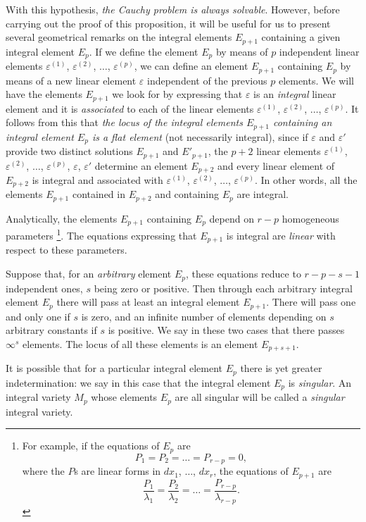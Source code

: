 \documentclass[leqno,11pt]{book}
\makeatletter
\theoremstyle{shape1}
\theoremstyle{shapesmall}
\let\old@epsilon\epsilon
\let\old@varepsilon\varepsilon
\let\epsilon\old@varepsilon
\let\varepsilon\old@epsilon
\makeatother
\begin{document}
With this hypothesis, \emph{the Cauchy problem is always solvable}. However, before carrying out the proof of this proposition, it will be useful for us to present several geometrical remarks on the integral elements $E_{p+1}$ containing a given integral element $E_{p}$. If we define the element $E_{p}$ by means of $p$ independent linear elements $\epsilon^{(1)}$, $\epsilon^{(2)}$, $\dots$, $\epsilon^{(p)}$, we can define an element $E_{p+1}$ containing $E_{p}$ by means of a new linear element $\epsilon$ independent of the previous $p$ elements. We will have the elements $E_{p+1}$ we look for by expressing that $\epsilon$ is an \emph{integral} linear element and it is \emph{associated} to each of the linear elements $\epsilon^{(1)}$, $\epsilon^{(2)}$, $\dots$, $\epsilon^{(p)}$. It follows from this that \emph{the locus of the integral elements $E_{p+1}$ containing an integral element $E_{p}$ is a flat element} (not necessarily integral), since if $\epsilon$ and $\epsilon'$ provide two distinct solutions $E_{p+1}$ and $E'_{p+1}$, the $p+2$ linear elements $\epsilon^{(1)}$, $\epsilon^{(2)}$, $\dots$, $\epsilon^{(p)}$, $\epsilon$, $\epsilon'$ determine an element $E_{p+2}$ and every linear element of $E_{p+2}$ is integral and associated with $\epsilon^{(1)}$, $\epsilon^{(2)}$, $\dots$, $\epsilon^{(p)}$. In other words, all the elements $E_{p+1}$ contained in $E_{p+2}$ and containing $E_{p}$ are integral.

Analytically, the elements $E_{p+1}$ containing $E_{p}$ depend on $r-p$ homogeneous parameters \footnote{For example, if the equations of $E_{p}$ are
\[
P_{1}=P_{2}=\dots=P_{r-p}=0,
\]
where the $P$s are linear forms in $dx_{1}$, $\dots$, $dx_{r}$, the equations of $E_{p+1}$ are
\[
\frac{P_{1}}{\lambda_{1}}=\frac{P_{2}}{\lambda_{2}}=\dots=\frac{P_{r-p}}{\lambda_{r-p}}.
\]}. The equations expressing that $E_{p+1}$ is integral are \emph{linear} with respect to these parameters.

Suppose that, for an \emph{arbitrary} element $E_{p}$, these equations reduce to $r-p-s-1$ independent ones, $s$ being zero or positive. Then through each arbitrary integral element $E_{p}$ there will pass at least an integral element $E_{p+1}$. There will pass one and only one if $s$ is zero, and an infinite number of elements depending on $s$ arbitrary constants if $s$ is positive. We say in these two cases that there passes $\infty^{s}$ elements. The locus of all these elements is an element $E_{p+s+1}$.

It is possible that for a particular integral element $E_{p}$ there is yet greater indetermination: we say in this case that the integral element $E_{p}$ is \emph{singular}. An integral variety $M_{p}$ whose elements $E_{p}$ are all singular will be called a \emph{singular} integral variety.
\end{document}
